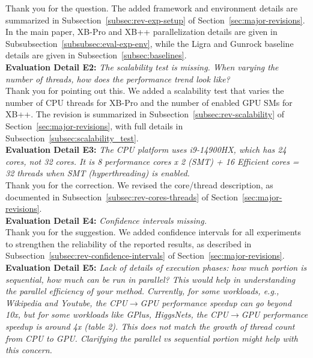 \noindent Thank you for the question. The added framework and environment details are summarized in Subsection~\ref{subsec:rev-exp-setup} of Section~\ref{sec:major-revisions}. In the main paper, XB-Pro and XB++ parallelization details are given in Subsubsection~\ref{subsubsec:eval-exp-env}, while the Ligra and Gunrock baseline details are given in Subsection~\ref{subsec:baselines}.
\\

\noindent\textbf{Evaluation Detail E2:} \textit{The scalability test is missing. When varying the number of threads, how does the performance trend look like?}
\\

\noindent Thank you for pointing out this. We added a scalability test that varies the number of CPU threads for XB-Pro and the number of enabled GPU SMs for XB++.
The revision is summarized in Subsection~\ref{subsec:rev-scalability} of Section~\ref{sec:major-revisions}, with full details in Subsection~\ref{subsec:scalability_test}.
\\

\noindent\textbf{Evaluation Detail E3:} \textit{The CPU platform uses i9-14900HX, which has 24 cores, not 32 cores. It is 8 performance cores x 2 (SMT) + 16 Efficient cores = 32 threads when SMT (hyperthreading) is enabled.}
\\

\noindent Thank you for the correction. We revised the core/thread description, as documented in Subsection~\ref{subsec:rev-cores-threads} of Section~\ref{sec:major-revisions}.
\\

\noindent\textbf{Evaluation Detail E4:} \textit{Confidence intervals missing.}
\\

\noindent Thank you for the suggestion. We added confidence intervals for all experiments to strengthen the reliability of the reported results, as described in Subsection~\ref{subsec:rev-confidence-intervals} of Section~\ref{sec:major-revisions}.
\\

\noindent\textbf{Evaluation Detail E5:} \textit{Lack of details of execution phases: how much portion is sequential, how much can be run in parallel? This would help in understanding the parallel efficiency of your method. Currently, for some workloads, e.g., Wikipedia and Youtube, the CPU$\rightarrow$GPU performance speedup can go beyond 10x, but for some workloads like GPlus, HiggsNets, the CPU$\rightarrow$GPU performance speedup is around 4x (table 2). This does not match the growth of thread count from CPU to GPU. Clarifying the parallel vs sequential portion might help with this concern.}
\\

